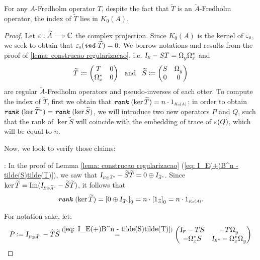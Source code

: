 \begin{proposicao}
\label{prop: ruy 3.9}
For any $A$-Fredholm operator $T$, despite the fact that $\widetilde T$ is an $\widetilde{A}$-Fredholm operator, the index of $\widetilde T$ lies in $K_0(A)$.
\begin{proof}
Let $\ep: \widetilde{A} \longtwoheadrightarrow \C$ the complex projection. Since $K_0(A)$ is the kernel of $\sub\ep{0}$, we seek to obtain that $\sub\ep{0}(\ind \widetilde T) = 0$. We borrow notations and results from the proof of \ref{lema: construcao regularizacao}, i.e. $\sub \Id E-ST= \Omega_y^{\,}\Omega_x^*$ and 
\begin{equation*}
    \widetilde T \coloneqq \begin{pmatrix} T & 0 \\ \Omega_x^* & 0 \end{pmatrix} \hspace{0.25cm}\operatorname{and}\hspace{0.25cm}
    \widetilde S \coloneqq \begin{pmatrix} S & \Omega_y^{\,} \\ 0 & 0\end{pmatrix}
\end{equation*}
are regular $\widetilde{A}$-Fredholm operators and pseudo-inverses of each otter. To compute the index of $\widetilde T$, first we obtain that $\rank(\ker \widetilde T) = n\cdot \sub 1{K_0(A)}$; in order to obtain $\texttt{\textit{rank}}\, (\ker \widetilde T^*)= \texttt{\textit{rank}}\,(\ker \widetilde S)$, we will introduce two new operators $P$ and $Q$, such that the rank of $\ker \widetilde{S}$ will coincide with the embedding of trace of $\operatorname{{\varepsilon}}(Q)$, which will be equal to $n$. 

Now, we look to verify those claims:
\begin{itroman}
    \item {}: In the proof of Lemma \ref{lema: construcao regularizacao} (\ref{eq: I_E(+)B^n - tilde(S)tilde(T)}), we saw that $\sub\Id{E\oplus \widetilde{A}^n}-\widetilde S\widetilde T=0 \oplus \sub\Id{\widetilde{A}^n}$. Since $\ker \widetilde T = \Im(\sub\Id{E\oplus \widetilde{A}^n}-\widetilde S\widetilde T)$, it follows that \begin{equation*}
        \rank(\ker \widetilde T) = \left[0 \oplus \sub\Id{\widetilde{A}^n}\right]_0 = n\cdot\left[\sub1{\widetilde{A}}\right]_0 = n \cdot \sub{1}{K_0(A)}.
    \end{equation*}
\end{itroman}    
For notation sake, let:
\begin{equation}
    \label{eq: P = Id - wide T wide S}
       P \coloneqq \sub \Id{F\oplus \widetilde{A}^n} - \widetilde T\widetilde S \overset{(\ref{eq: I_E(+)B^n - tilde(S)tilde(T)})}= \begin{pmatrix}
    \sub \Id F - TS & - T\Omega_y^{\,} \\ - \Omega_x^*S & \sub\Id{B^n}- \Omega_x^*\Omega_y^{\,}
    \end{pmatrix}
\end{equation}
    

\end{proof}
\end{proposicao}
